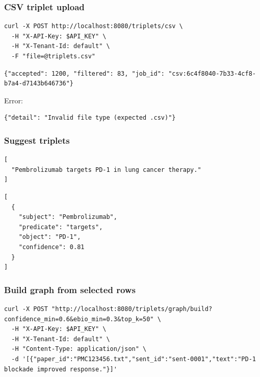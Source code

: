 \documentclass[10pt,letterpaper]{article}
\begin{document}
\subsubsection{CSV triplet upload}

\begin{Verbatim}[fontsize=\scriptsize,breaklines=true,breakanywhere=true]
curl -X POST http://localhost:8080/triplets/csv \
  -H "X-API-Key: $API_KEY" \
  -H "X-Tenant-Id: default" \
  -F "file=@triplets.csv"
\end{Verbatim}

\begin{Verbatim}[fontsize=\scriptsize,breaklines=true,breakanywhere=true]
{"accepted": 1200, "filtered": 83, "job_id": "csv:6c4f8040-7b33-4cf8-b7a4-d7143b646736"}
\end{Verbatim}

Error:

\begin{Verbatim}[fontsize=\scriptsize,breaklines=true,breakanywhere=true]
{"detail": "Invalid file type (expected .csv)"}
\end{Verbatim}

\subsubsection{Suggest triplets}

\begin{Verbatim}[fontsize=\scriptsize,breaklines=true,breakanywhere=true]
[
  "Pembrolizumab targets PD-1 in lung cancer therapy."
]
\end{Verbatim}

\begin{Verbatim}[fontsize=\scriptsize,breaklines=true,breakanywhere=true]
[
  {
    "subject": "Pembrolizumab",
    "predicate": "targets",
    "object": "PD-1",
    "confidence": 0.81
  }
]
\end{Verbatim}

\subsubsection{Build graph from selected rows}

\begin{Verbatim}[fontsize=\scriptsize,breaklines=true,breakanywhere=true]
curl -X POST "http://localhost:8080/triplets/graph/build?confidence_min=0.6&ebio_min=0.3&top_k=50" \
  -H "X-API-Key: $API_KEY" \
  -H "X-Tenant-Id: default" \
  -H "Content-Type: application/json" \
  -d '[{"paper_id":"PMC123456.txt","sent_id":"sent-0001","text":"PD-1 blockade improved response."}]'
\end{Verbatim}
\end{document}
